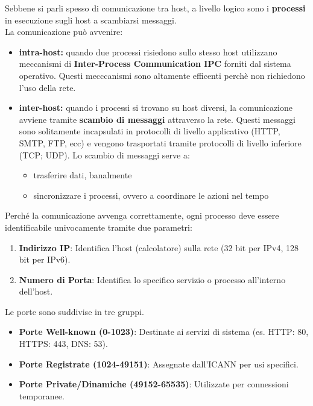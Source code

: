 \documentclass[12pt,a4paper,oneside]{book}
\begin{document}
Sebbene si parli spesso di comunicazione tra host, a livello logico sono i \textbf{processi} in esecuzione sugli host a scambiarsi messaggi.\\
La comunicazione può avvenire:
\begin{itemize}
    \item \textbf{intra-host:} quando due processi risiedono sullo stesso host utilizzano meccanismi di \textbf{Inter-Process Communication IPC} forniti dal sistema operativo. Questi mecccanismi sono altamente efficenti perchè non richiedono l'uso della rete.
    \item \textbf{inter-host:} quando i processi si trovano su host diversi, la comunicazione avviene tramite \textbf{scambio di messaggi} attraverso la rete. Questi messaggi sono solitamente incapsulati in protocolli di livello applicativo (HTTP, SMTP, FTP, ecc) e vengono trasportati tramite protocolli di livello inferiore (TCP; UDP). Lo scambio di messaggi serve a:
    \begin{itemize}
        \item trasferire dati, banalmente
        \item sincronizzare i processi, ovvero a coordinare le azioni nel tempo
    \end{itemize}
\end{itemize}

Perché la comunicazione avvenga correttamente, ogni processo deve essere identificabile univocamente tramite due parametri:
\begin{enumerate}
    \item \textbf{Indirizzo IP}: Identifica l'host (calcolatore) sulla rete (32 bit per IPv4, 128 bit per IPv6).
    \item \textbf{Numero di Porta}: Identifica lo specifico servizio o processo all'interno dell'host.
\end{enumerate}

Le porte sono suddivise in tre gruppi.
\begin{itemize}
    \item \textbf{Porte Well-known (0-1023)}: Destinate ai servizi di sistema (es. HTTP: 80, HTTPS: 443, DNS: 53).
    \item \textbf{Porte Registrate (1024-49151)}: Assegnate dall'ICANN per usi specifici.
    \item \textbf{Porte Private/Dinamiche (49152-65535)}: Utilizzate per connessioni temporanee.
\end{itemize}
\end{document}

